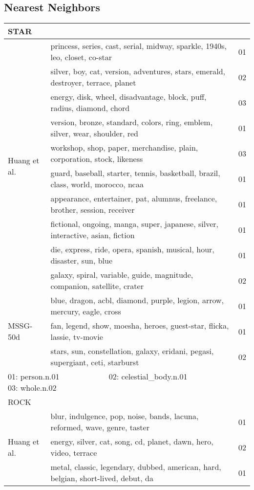 \documentclass[11pt]{article}
\begin{document}
\subsection{Nearest Neighbors}
\begin{table}[htbp]
\centering
\begin{tabular}{|l|l|l|}
\multicolumn{3}{l}{STAR}\\
\hline
\multirow{ 10}{*}{Huang et al.} &
princess, series, cast, serial, midway, sparkle, 1940s, leo, closet, co-star & 01 \\
& silver, boy, cat, version, adventures, stars, emerald, destroyer, terrace, planet& 02\\
& energy, disk, wheel, disadvantage, block, puff, radius, diamond, chord & 03 \\
& version, bronze, standard, colors, ring, emblem, silver, wear, shoulder, red & 01 \\
&workshop, shop, paper, merchandise, plain, corporation, stock, likeness&03\\
&guard, baseball, starter, tennis, basketball, brazil, class, world, morocco, ncaa &01\\
&appearance, entertainer, pat, alumnus, freelance, brother, session, receiver&01\\
&fictional, ongoing, manga, super, japanese, silver, interactive, asian, fiction&01\\
&die, express, ride, opera, spanish, musical, hour, disaster, sun, blue&01\\
&galaxy, spiral, variable, guide, magnitude, companion, satellite, crater&02\\
\hline
\multirow{3}{*}{MSSG-50d} 
& blue, dragon, acbl, diamond, purple, legion, arrow, mercury, eagle, cross & 01\\
& fan, legend, show, moesha, heroes, guest-star, flicka, lassie, tv-movie& 01\\
& stars, sun, constellation, galaxy, eridani, pegasi, supergiant, ceti, starburst&02\\
\hline
\multicolumn{3}{l}{01: person.n.01 ~~~~~~~~~~~~02: celestial\_body.n.01~~~~~~~~~~~~ 03: whole.n.02} \\[0.2cm]
\multicolumn{3}{l}{ROCK}\\
\hline
\multirow{ 10}{*}{Huang et al.} &
blur, indulgence, pop, noise, bands, lacuna, reformed, wave, genre, taster & 01 \\
& energy, silver, cat, song, cd, planet, dawn, hero, video, terrace & 02 \\
& metal, classic, legendary, dubbed, american, hard, belgian, short-lived, debut, da & 01 \\

\end{tabular}
\end{table}
\end{document}
